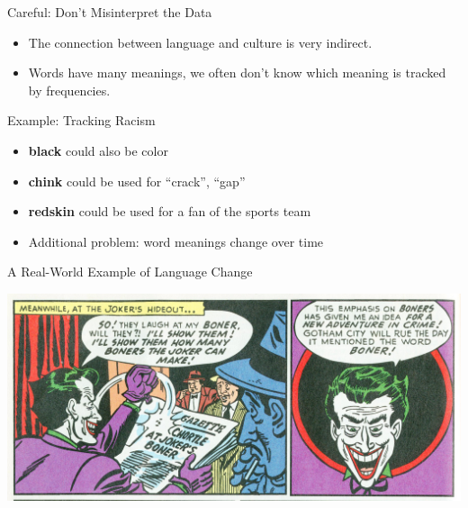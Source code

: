 \documentclass[professionalfonts, xcolor={usenames,svgnames,x11names,table}]{beamer}
\begin{document}
\begin{frame}{Careful: Don't Misinterpret the Data}
    \begin{itemize}
        \item The connection between language and culture is very indirect.
        \item Words have many meanings, we often don't know which meaning is tracked by frequencies.
    \end{itemize}
    \begin{exampleblock}{Example: Tracking Racism}
        \begin{itemize}
            \item \textbf{black} could also be color
            \item \textbf{chink} could be used for ``crack'', ``gap''
            \item \textbf{redskin} could be used for a fan of the sports team
        \end{itemize}
    \end{exampleblock}
    \begin{itemize}
        \item Additional problem: word meanings change over time
    \end{itemize}
\end{frame}

\begin{frame}{A Real-World Example of Language Change}
    \begin{center}
        \includegraphics[width=1\linewidth]{./img/boner}
    \end{center}
\end{frame}
\end{document}
